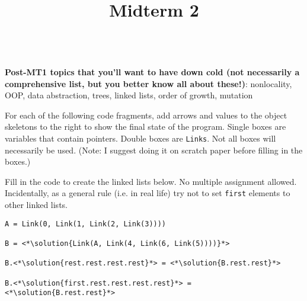 \documentclass[twoside]{article}
\title{\sc Midterm 2 \solution{Solutions}}
\newcommand{\solution}[1]{{\color{red}#1}}
\newcommand{\solutionimage}[2]{#2} %
\newcommand\solution[1]{} %
\newcommand{\solutionimage}[2]{#1} %
\begin{document}
\thispagestyle{empty}
\maketitle

\leavevmode\\
\textbf{Post-MT1 topics that you'll want to have down cold (not necessarily a comprehensive list, but you better know all about these!)}: nonlocality, OOP, data abstraction, trees, linked lists, order of growth, mutation

\begin{enumerate}

For each of the following code fragments, add arrows and values to the object skeletons to the right to show the final state of the program.  Single boxes are variables that contain pointers.  Double boxes are \lstinline/Links/. Not all boxes will necessarily be used. (Note: I suggest doing it on scratch paper before filling in the boxes.)

\vspace{0.2in}

\solutionimage{}{}

\vspace{0.2in}

Fill in the code to create the linked lists below. No multiple assignment allowed. Incidentally, as a general rule (i.e. in real life) try not to set \texttt{first} elements to other linked lists.

\vspace{0.2in}



\vspace{0.2in}

\begin{lstlisting}
A = Link(0, Link(1, Link(2, Link(3))))

B = <*\solution{Link(A, Link(4, Link(6, Link(5))))}*>

B.<*\solution{rest.rest.rest.rest}*> = <*\solution{B.rest.rest}*>

B.<*\solution{first.rest.rest.rest.rest}*> = <*\solution{B.rest.rest}*>
\end{lstlisting}

\solutionimage{}{}

\end{enumerate}
\end{document}
